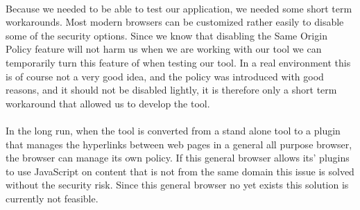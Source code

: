 	\paragraph{}
		Because we needed to be able to test our application, we needed some short term workarounds. Most modern browsers can be customized rather easily to disable some of the security options. Since we know that disabling the Same Origin Policy feature will not harm us when we are working with our tool we can temporarily turn this feature of when testing our tool. In a real environment this is of course not a very good idea, and the policy was introduced with good reasons, and it should not be disabled lightly, it is therefore only a short term workaround that allowed us to develop the tool.
	\paragraph{}
	In the long run, when the tool is converted from a stand alone tool to a plugin that manages the hyperlinks between web pages in a general all purpose browser, the browser can manage its own policy. If this general browser allows its' plugins to use JavaScript on content that is not from the same domain this issue is solved without the security risk. Since this general browser no yet exists this solution is currently not feasible.
